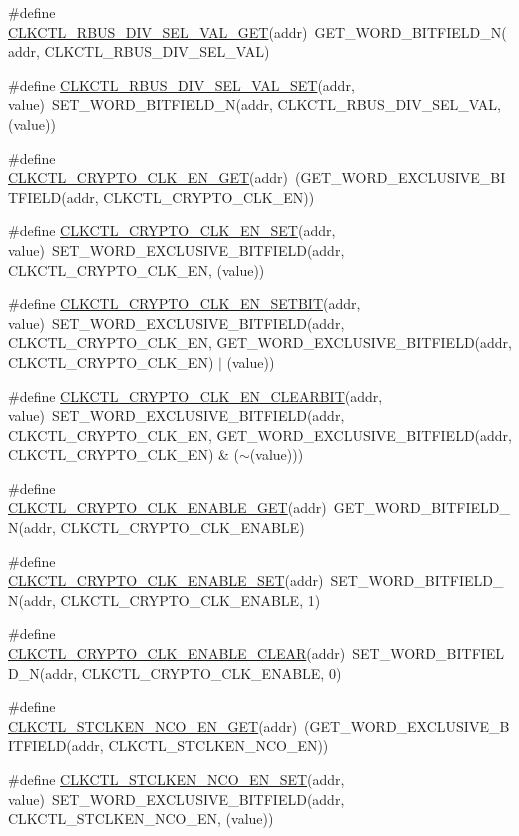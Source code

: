\begin{DoxyCompactItemize}
\item 
\#define \hyperlink{a00544_a606b439facbaeb5c82d61ff1a4ef3464}{CLKCTL\_\-RBUS\_\-DIV\_\-SEL\_\-VAL\_\-GET}(addr)~GET\_\-WORD\_\-BITFIELD\_\-N(addr, CLKCTL\_\-RBUS\_\-DIV\_\-SEL\_\-VAL)
\item 
\#define \hyperlink{a00544_a69107635aa057d765c28dd3da0fb706c}{CLKCTL\_\-RBUS\_\-DIV\_\-SEL\_\-VAL\_\-SET}(addr, value)~SET\_\-WORD\_\-BITFIELD\_\-N(addr, CLKCTL\_\-RBUS\_\-DIV\_\-SEL\_\-VAL, (value))
\item 
\#define \hyperlink{a00544_abac3421e22791439148225d308a4d79a}{CLKCTL\_\-CRYPTO\_\-CLK\_\-EN\_\-GET}(addr)~(GET\_\-WORD\_\-EXCLUSIVE\_\-BITFIELD(addr, CLKCTL\_\-CRYPTO\_\-CLK\_\-EN))
\item 
\#define \hyperlink{a00544_a2175f4aa8cbadf82ddf104816fc958bc}{CLKCTL\_\-CRYPTO\_\-CLK\_\-EN\_\-SET}(addr, value)~SET\_\-WORD\_\-EXCLUSIVE\_\-BITFIELD(addr, CLKCTL\_\-CRYPTO\_\-CLK\_\-EN, (value))
\item 
\#define \hyperlink{a00544_a46cc0d4e28bf9cc9002e5db4829e4394}{CLKCTL\_\-CRYPTO\_\-CLK\_\-EN\_\-SETBIT}(addr, value)~SET\_\-WORD\_\-EXCLUSIVE\_\-BITFIELD(addr, CLKCTL\_\-CRYPTO\_\-CLK\_\-EN, GET\_\-WORD\_\-EXCLUSIVE\_\-BITFIELD(addr, CLKCTL\_\-CRYPTO\_\-CLK\_\-EN) $|$ (value))
\item 
\#define \hyperlink{a00544_adb0c0281083bc32282b1057b8b11eeec}{CLKCTL\_\-CRYPTO\_\-CLK\_\-EN\_\-CLEARBIT}(addr, value)~SET\_\-WORD\_\-EXCLUSIVE\_\-BITFIELD(addr, CLKCTL\_\-CRYPTO\_\-CLK\_\-EN, GET\_\-WORD\_\-EXCLUSIVE\_\-BITFIELD(addr, CLKCTL\_\-CRYPTO\_\-CLK\_\-EN) \& ($\sim$(value)))
\item 
\#define \hyperlink{a00544_a4ef1b705aa482046f410951d3ad73973}{CLKCTL\_\-CRYPTO\_\-CLK\_\-ENABLE\_\-GET}(addr)~GET\_\-WORD\_\-BITFIELD\_\-N(addr, CLKCTL\_\-CRYPTO\_\-CLK\_\-ENABLE)
\item 
\#define \hyperlink{a00544_acd522d3947a5aab0d6c39f608bb587d5}{CLKCTL\_\-CRYPTO\_\-CLK\_\-ENABLE\_\-SET}(addr)~SET\_\-WORD\_\-BITFIELD\_\-N(addr, CLKCTL\_\-CRYPTO\_\-CLK\_\-ENABLE, 1)
\item 
\#define \hyperlink{a00544_a2137d59ae8e63d491abde4df94ebfeeb}{CLKCTL\_\-CRYPTO\_\-CLK\_\-ENABLE\_\-CLEAR}(addr)~SET\_\-WORD\_\-BITFIELD\_\-N(addr, CLKCTL\_\-CRYPTO\_\-CLK\_\-ENABLE, 0)
\item 
\#define \hyperlink{a00544_a2565ff7b2d1e9ce9961c7f36cc758e4c}{CLKCTL\_\-STCLKEN\_\-NCO\_\-EN\_\-GET}(addr)~(GET\_\-WORD\_\-EXCLUSIVE\_\-BITFIELD(addr, CLKCTL\_\-STCLKEN\_\-NCO\_\-EN))
\item 
\#define \hyperlink{a00544_aeaa38505fe19525265ff896d5d212800}{CLKCTL\_\-STCLKEN\_\-NCO\_\-EN\_\-SET}(addr, value)~SET\_\-WORD\_\-EXCLUSIVE\_\-BITFIELD(addr, CLKCTL\_\-STCLKEN\_\-NCO\_\-EN, (value))

\end{DoxyCompactItemize}
